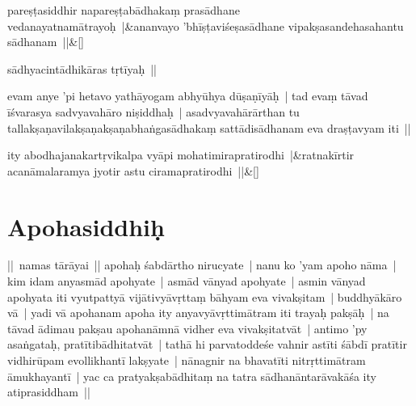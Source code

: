 \documentclass[article,12pt,a4paper]{memoir}%
\newcounter{parCount}
\begin{document}
	    
	    \stanza[\smallbreak]
	  pareṣṭasiddhir napareṣṭabādhakaṃ prasādhane vedanayatnamātrayoḥ |&ananvayo 'bhīṣṭaviśeṣasādhane vipakṣasandehasahantu sādhanam ||\&[\smallbreak]
	  
	  
	  \label{īsd-sādhyacintā}
	  
	

	  
	  \pstart \leavevmode%
	sādhyacintādhikāras tṛtīyaḥ ||
	{}
	\pend%
      

	  
	  \pstart \leavevmode%
	\label{thakur75-57.11}evam anye 'pi hetavo yathāyogam abhyūhya dūṣaṇīyāḥ | tad evaṃ tāvad īśvarasya sadvyavahāro niṣiddhaḥ | asadvyavahārārthan tu tallakṣaṇavilakṣaṇakṣaṇabhaṅgasādhakaṃ sattādisādhanam eva draṣṭavyam iti ||\leavevmode{}\label{RNAms_32B1}
	{}
	\pend%
      
	    
	    \stanza[\smallbreak]
	  \label{thakur75-57.14}ity abodhajanakartṛvikalpa vyāpi mohatimirapratirodhi |&ratnakīrtir acanāmalaramya jyotir astu ciramapratirodhi ||\&[\smallbreak]
	  
	  
	  
	    
	    \endnumbering%
	    
	  
	  
	
	    
	    \beginnumbering%
	    
	  
\chapter[{Apohasiddhiḥ}][{Apohasiddhiḥ}]{Apohasiddhiḥ}\label{Apohasiddhiḥ}

	  
	  \pstart \leavevmode%
	\label{thakur75-58.4}|| namas tārāyai || \label{thakur75-58.5} apohaḥ śabdārtho nirucyate | nanu ko 'yam apoho nāma | kim idam anyasmād apohyate | asmād vānyad apohyate | asmin vānyad apohyata iti vyutpattyā vijātivyāvṛttaṃ bāhyam eva vivakṣitam | buddhyākāro vā | yadi vā apohanam apoha ity anyavyāvṛttimātram iti trayaḥ pakṣāḥ | \label{thakur75-58.9} na tāvad ādimau pakṣau apohanāmnā vidher eva vivakṣitatvāt | antimo 'py asaṅgataḥ, pratītibādhitatvāt | tathā hi parvatoddeśe vahnir astīti śābdī pratītir vidhirūpam evollikhantī lakṣyate | nānagnir na bhavatīti nitrṛttimātram āmukhayantī | yac ca pratyakṣabādhitaṃ na tatra sādhanāntarāvakāśa ity atiprasiddham ||
	{}
	\pend%
      
\end{document}
